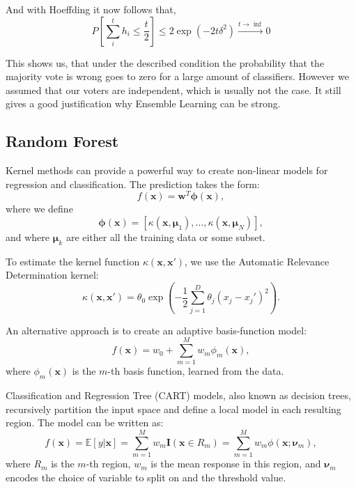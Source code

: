 And with Hoeffding it now follows that,
\begin{equation*}
    P \left [ \sum_i^t h_i \leq \frac{t}{2} \right] \leq 2\exp \left ( -2t \delta^2 \right) \xrightarrow{t \rightarrow \inf} 0
\end{equation*}

This shows us, that under the described condition the probability that the majority vote is wrong goes to zero for a large amount of classifiers. However we assumed that our voters are independent, which is usually not the case. It still gives a good justification why Ensemble Learning can be strong. 

\subsection{Random Forest}

Kernel methods can provide a powerful way to create non-linear models for regression and classification. The prediction takes the form:
\begin{equation}
    f(\mathbf{x}) = \mathbf{w}^T \boldsymbol{\phi}(\mathbf{x}),
\end{equation}
where we define
\begin{equation}
    \boldsymbol{\phi}(\mathbf{x}) = [\kappa(\mathbf{x}, \boldsymbol{\mu}_1), \ldots, \kappa(\mathbf{x}, \boldsymbol{\mu}_N)],
\end{equation}
and where $\boldsymbol{\mu}_k$ are either all the training data or some subset.

To estimate the kernel function $\kappa(\mathbf{x}, \mathbf{x}')$, we use the Automatic Relevance Determination kernel:
\begin{equation}
    \kappa(\mathbf{x}, \mathbf{x}') = \theta_0 \exp \left( -\frac{1}{2} \sum_{j=1}^D \theta_j (x_j - x_j')^2 \right).
\end{equation}

An alternative approach is to create an adaptive basis-function model:
\begin{equation}
    f(\mathbf{x}) = w_0 + \sum_{m=1}^M w_m \phi_m(\mathbf{x}),
\end{equation}
where $\phi_m(\mathbf{x})$ is the $m$-th basis function, learned from the data.

Classification and Regression Tree (CART) models, also known as decision trees, recursively partition the input space and define a local model in each resulting region. The model can be written as:
\begin{equation}
    f(\mathbf{x}) = \mathbb{E}[y|\mathbf{x}] = \sum_{m=1}^M w_m \mathbf{I}(\mathbf{x} \in R_m) = \sum_{m=1}^M w_m \phi(\mathbf{x}; \boldsymbol{\nu}_m),
\end{equation}
where $R_m$ is the $m$-th region, $w_m$ is the mean response in this region, and $\boldsymbol{\nu}_m$ encodes the choice of variable to split on and the threshold value.

